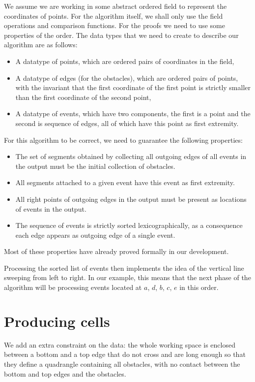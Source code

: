 \documentclass{llncs}
\begin{document}
We assume we are working in some abstract ordered field to represent the
coordinates of points.  For the algorithm itself, we shall only use the field
operations and comparison functions.  For the proofs we need to use some
properties of the order.
The data types that we need to create to describe our algorithm are as
follows:
\begin{itemize}
\item A datatype of points, which are ordered pairs of coordinates in the field,
\item A datatype of edges (for the obstacles), which are ordered pairs of
  points, with the invariant that the first coordinate of the first
  point is strictly smaller than the first coordinate of the second point,
\item A datatype of events, which have two components, the first is a
  point and the second is sequence of edges, all of which have this
  point as first extremity.
\end{itemize}
For this algorithm to be correct, we need to guarantee the following
properties:
\begin{itemize}
\item The set of segments obtained by collecting all outgoing edges of
  all events in the output must be the initial collection of obstacles.
\item All segments attached to a given event have this event as first
  extremity.
\item All right points of outgoing edges in the output must be present
  as locations of events in the output.
\item The sequence of events is strictly sorted lexicographically, as
  a consequence each edge appears as outgoing edge of a single event.
\end{itemize}
Most of these properties have already proved formally in our
development.

Processing the sorted list of events then implements the idea of the
vertical line sweeping from left to right.  In our example, this means
that the next phase of the algorithm will be processing events located at
\(a\), \(d\), \(b\), \(c\), \(e\) in this order.

\section{Producing cells}
We add an extra constraint on the data: the whole working space is
enclosed between a bottom and a top edge that do not cross and are
long enough so that they define a quadrangle containing all obstacles,
with no contact between the bottom and top edges and the obstacles.
\end{document}
